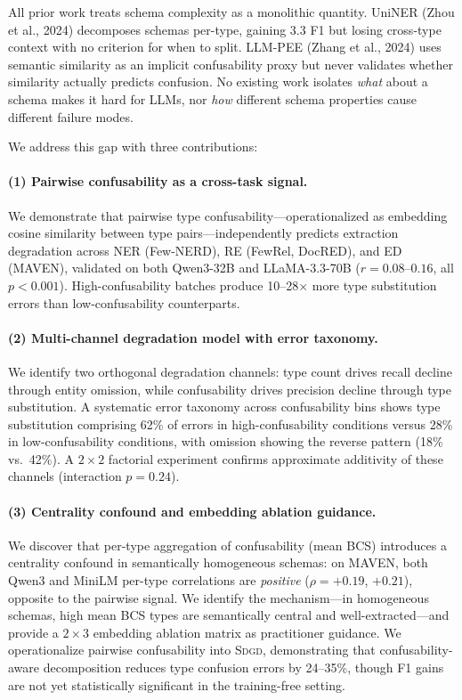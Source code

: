\documentclass[11pt,a4paper]{article}
\newcommand{\sdgd}{\textsc{Sdgd}}
\begin{document}
All prior work treats schema complexity as a monolithic quantity.
UniNER (Zhou et al., 2024) decomposes schemas per-type, gaining 3.3 F1 but losing cross-type context with no criterion for when to split.
LLM-PEE (Zhang et al., 2024) uses semantic similarity as an implicit confusability proxy but never validates whether similarity actually predicts confusion.
No existing work isolates \emph{what} about a schema makes it hard for LLMs, nor \emph{how} different schema properties cause different failure modes.

We address this gap with three contributions:

\paragraph{(1) Pairwise confusability as a cross-task signal.}
We demonstrate that pairwise type confusability---operationalized as embedding cosine similarity between type pairs---independently predicts extraction degradation across NER (Few-NERD), RE (FewRel, DocRED), and ED (MAVEN), validated on both Qwen3-32B and LLaMA-3.3-70B ($r{=}0.08$--$0.16$, all $p{<}0.001$).
High-confusability batches produce 10--28$\times$ more type substitution errors than low-confusability counterparts.

\paragraph{(2) Multi-channel degradation model with error taxonomy.}
We identify two orthogonal degradation channels: type count drives recall decline through entity omission, while confusability drives precision decline through type substitution.
A systematic error taxonomy across confusability bins shows type substitution comprising 62\% of errors in high-confusability conditions versus 28\% in low-confusability conditions, with omission showing the reverse pattern (18\% vs.\ 42\%).
A $2{\times}2$ factorial experiment confirms approximate additivity of these channels (interaction $p{=}0.24$).

\paragraph{(3) Centrality confound and embedding ablation guidance.}
We discover that per-type aggregation of confusability (mean BCS) introduces a centrality confound in semantically homogeneous schemas: on MAVEN, both Qwen3 and MiniLM per-type correlations are \emph{positive} ($\rho{=}+0.19$, $+0.21$), opposite to the pairwise signal.
We identify the mechanism---in homogeneous schemas, high mean BCS types are semantically central and well-extracted---and provide a $2{\times}3$ embedding ablation matrix as practitioner guidance.
We operationalize pairwise confusability into \sdgd{}, demonstrating that confusability-aware decomposition reduces type confusion errors by 24--35\%, though F1 gains are not yet statistically significant in the training-free setting.
\end{document}

